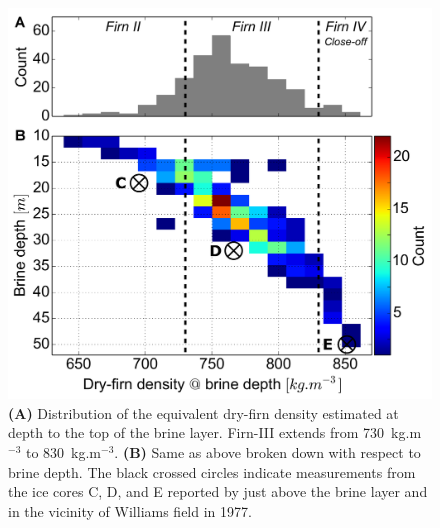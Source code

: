 \documentclass[draft,grl]{agutex}
\begin{document}
\begin{figure}
 \noindent\includegraphics[width=\textwidth]{fig4}
 \caption{\textbf{(A)} Distribution of the equivalent dry-firn density estimated at depth to the top of the brine layer. Firn-III extends from 730~kg.m$^{-3}$ to 830~kg.m$^{-3}$. \textbf{(B)} Same as above broken down with respect to brine depth. The black crossed circles indicate measurements from the ice cores C, D, and E reported by \citet{Kovacs-1982-ID701} just above the brine layer and in the vicinity of Williams field in 1977.}
 \label{figure_4}
 \end{figure}
\end{document}
